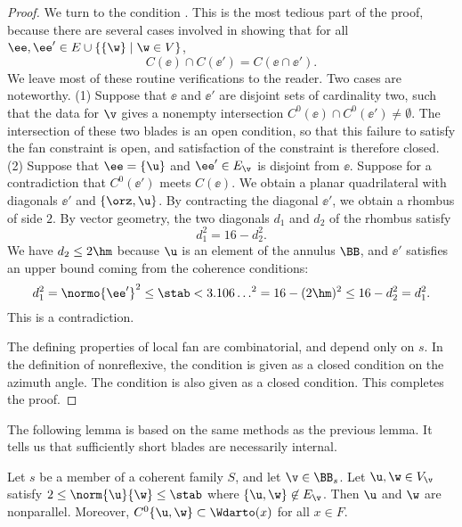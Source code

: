 \begin{proof}
We turn to the condition .  This is the most tedious part 
of the proof, because there are several cases involved in showing that 
for all $\ee ,\ee '\in E \cup \{\{\w\}\mid \w\in V\}$, 
\[ C(\ee )\cap C(\ee ') = C(\ee \cap \ee ').\] We leave most of these
routine verifications to the reader.  Two cases are noteworthy.  (1)
Suppose that $\ee$ and $\ee'$ are disjoint sets of cardinality two,
such that the data for $\v$ gives a nonempty intersection
$C^0(\ee)\cap C^0(\ee')\ne\emptyset$.  The intersection of these two
blades is an open condition, so that this failure to satisfy the fan
constraint is open, and satisfaction of the constraint is therefore
closed.  (2) Suppose that $\ee=\{\u\}$ and $\ee'\in E_\v$ is disjoint
from $\ee$.  Suppose for a contradiction that $C^0(\ee')$ meets
$C(\ee)$.  We obtain a planar quadrilateral with diagonals $\ee'$ and
$\{\orz,\u\}$.  By contracting the diagonal $\ee'$, we obtain a
rhombus of side $2$.  By vector geometry, the two diagonals $d_1$ and
$d_2$ of the rhombus satisfy
\begin{equation}\label{eqn:rhombus16}
d_1^2 = 16 - d_2^2.
\end{equation}
We have $d_2\le 2\hm$ because  $\u$ is an element of the annulus $\BB$,
 and $\ee'$ satisfies an upper bound coming from the
coherence conditions:
\begin{equation}\label{eqn:rhombus}
d_1^2 = \normo{\ee'}^2\le \stab< 3.106\ldots^2 = 
16-(2\hm)^2 \le 16-d_2^2 = d_1^2.
\end{equation}
This is a contradiction. 

The defining properties of local fan are combinatorial, and depend only on 
$s$.
In the definition of nonreflexive, the condition  is given
as a closed condition on the azimuth angle.  The condition
 is also given as a closed condition.
This completes the proof.
\end{proof}

The following lemma is based on the same methods as the previous
lemma.  It tells us that sufficiently short blades are necessarily
internal.

\begin{lemma}[]\label{lemma:2hm-slice}
Let $s$ be a member of a coherent family $S$, and let $\v\in \BB_s$.
Let $\u,\w\in V_\v$ satisfy $2\le\norm{\u}{\w}\le \stab$ where
$\{\u,\w\}\not\in E_\v$.  Then $\u$ and $\w$ are nonparallel.
Moreover,
$C^0\{\u,\w\}\subset \Wdarto(x)$ for all $x\in F$.
\end{lemma}

